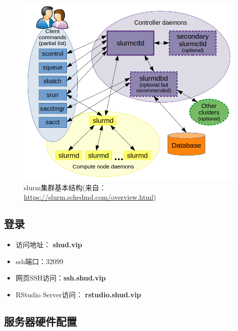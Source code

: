 \documentclass[
]{ctexbook}
\providecommand{\tightlist}{%
  \setlength{\itemsep}{0pt}\setlength{\parskip}{0pt}}
\begin{document}
\begin{figure}
\centering
\includegraphics{Fig/ch5/slurm_arch.png}
\caption{slurm集群基本结构(来自：\url{https://slurm.schedmd.com/overview.html})}
\end{figure}

\hypertarget{ux767bux5f55}{%
\subsection{登录}\label{ux767bux5f55}}

\begin{itemize}
\tightlist
\item
  访问地址： \textbf{shud.vip}
\item
  ssh端口：32099
\item
  网页SSH访问：\textbf{ssh.shud.vip}
\item
  RStudio Server访问： \textbf{rstudio.shud.vip}
\end{itemize}

\hypertarget{ux670dux52a1ux5668ux786cux4ef6ux914dux7f6e}{%
\subsection{服务器硬件配置}\label{ux670dux52a1ux5668ux786cux4ef6ux914dux7f6e}}
\end{document}
